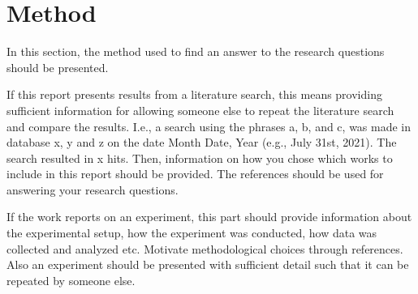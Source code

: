 \section{Method}
\label{section:method}
In this section, the method used to find an answer to the research questions should be presented. 

If this report presents results from a literature search, this means providing sufficient information for allowing someone else to repeat the literature search and compare the results. I.e., a search using the phrases a, b, and c, was made in database x, y and z on the date Month Date, Year (e.g., July 31st, 2021). The search resulted in x hits. Then, information on how you chose which works to include in this report should be provided. The references should be used for answering your research questions.

If the work reports on an experiment, this part should provide information about the experimental setup, how the experiment was conducted, how data was collected and analyzed etc. Motivate methodological choices through references. Also an experiment should be presented with sufficient detail such that it can be repeated by someone else.